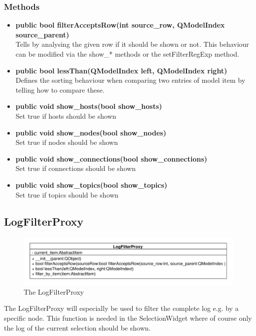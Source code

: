 \subsubsection{Methods}
\begin{itemize}
  \item \textbf{public bool filterAcceptsRow(int source\_row, QModelIndex
  source\_parent)}\\
  Tells by analysing the given row if it should be shown or not. This behaviour can be modified via the show\_* methods or the setFilterRegExp method.
  \item \textbf{public bool lessThan(QModelIndex left, QModelIndex right)}\\
  Defines the sorting behaviour when comparing two entries of model item by telling how to compare these.
  \item \textbf{public void show\_hosts(bool show\_hosts)}\\
  Set true if hosts should be shown
  \item \textbf{public void show\_nodes(bool show\_nodes)}\\
  Set true if nodes should be shown
  \item \textbf{public void show\_connections(bool show\_connections)}\\
  Set true if connections should be shown
  \item \textbf{public void show\_topics(bool show\_topics)}\\
  Set true if topics should be shown
\end{itemize}

\subsection{LogFilterProxy}
\begin{figure}[htbp]
	\begin{minipage}[t]{7cm}
		\vspace{0pt}
		\centering
		\includegraphics[scale=0.6]{./diagram_pictures/LogFilter.pdf}
		\caption{The LogFilterProxy}
	\end{minipage}	
\end{figure} 
The LogFilterProxy will especially be used to filter the complete log e.g. by a
specific node. This function is needed in the SelectionWidget where of course
only the log of the current selection should be shown.
